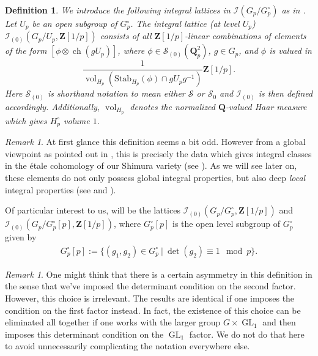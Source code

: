 \documentclass{amsart}%
\theoremstyle{plain}
\theoremstyle{plain}
\newtheorem{defn}[thm]{Definition}
\theoremstyle{remark}
\newtheorem{rem}[thm]{Remark}
\DeclareMathOperator{\GL}{GL}
\DeclareMathOperator{\ch}{ch}
\DeclareMathOperator{\vol}{vol}
\begin{document}
\begin{defn}\label{def integral lattice} We introduce the following integral lattices in $\mathcal{I}(G_p/G_p^\circ)$ as in \emph{\cite[Definition $3.2.1$]{Loeffler_2021}}. Let $U_p$ be an open subgroup of $G_p^\circ$. 
   The \textit{integral} lattice \emph{(}at level $U_p$\emph{)} $\mathcal{I}_{(0)}(G_p/U_p,\mathbf{Z}[1/p])$ consists of all $\mathbf{Z}[1/p]$-linear combinations of elements of the form $[\phi\otimes \ch(gU_p)]$, where $\phi\in\mathcal{S}_{(0)}(\mathbf{Q}_p^2)$, $g\in G_p$, and $\phi$ is valued in 
   $$\frac{1}{\vol_{H_p}\left(\mathrm{Stab}_{H_p}(\phi)\cap g U_p g^{-1}\right)}\mathbf{Z}[1/p].$$
   Here $\mathcal{S}_{(0)}$ is shorthand notation to mean either $\mathcal{S}$ or $\mathcal{S}_0$ and $\mathcal{I}_{(0)}$ is then defined accordingly. Additionally, $\vol_{H_p}$ denotes the normalized $\mathbf{Q}$-valued Haar measure which gives $H_p^\circ$ volume $1$.
\end{defn}
\begin{rem}
    At first glance this definition seems a bit odd. However from a global viewpoint as pointed out in \cite{Loeffler_2021}, this is precisely the data which gives integral classes in the \'etale cohomology of our Shimura variety (see ).  As we will see later on, these elements do not only possess global integral properties, but also deep \textit{local} integral properties (see  and ).
\end{rem}
\noindent Of particular interest to us, will be the lattices $\mathcal{I}_{(0)}(G_p/G_p^\circ,\mathbf{Z}[1/p])$ and $\mathcal{I}_{(0)}(G_p/G_p^\circ[p],\mathbf{Z}[1/p])$, where $G_p^\circ[p]$ is the open level subgroup of $G_p^\circ$ given by 
\begin{align}\label{eq: det levl}G_p^\circ[p]:=\{(g_1,g_2)\in G_p^\circ\ |\ \det(g_2)\equiv 1\mod p\}.\end{align}
\begin{rem}
    One might think that there is a certain asymmetry in this definition in the sense that we've imposed the determinant condition on the second factor. However, this choice is irrelevant. The results are identical if one imposes the condition on the first factor instead. In fact, the existence of this choice can be eliminated all together if one works with the larger group $G\times \GL_1$ and then imposes this determinant condition on the $\GL_1$ factor. We do not do that here to avoid unnecessarily complicating the notation everywhere else.
\end{rem}
\end{document}
